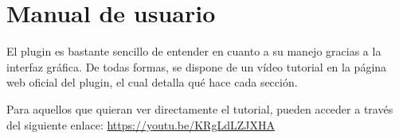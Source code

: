 \documentclass[a4paper, 12pt]{book}
\begin{document}
\cleardoublepage
\appendix
\chapter{Manual de usuario}
\label{app:manual}

El plugin es bastante sencillo de entender en cuanto a su manejo gracias a la interfaz gráfica. De todas formas, se dispone de un vídeo tutorial en la página web oficial del plugin, el cual detalla qué hace cada sección.

Para aquellos que quieran ver directamente el tutorial, pueden acceder a través del siguiente enlace: \url{https://youtu.be/KRgLdLZJXHA}


\cleardoublepage


\end{document}
